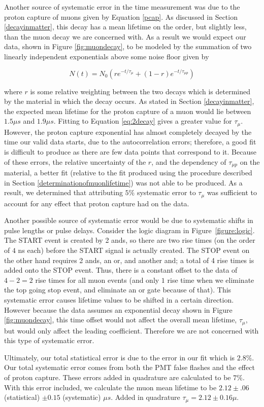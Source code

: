 Another source of systematic error in the time measurement was due to the proton capture of muons given by Equation \eqref{pcap}.  As discussed in Section \ref{decayinmatter}, this decay has a mean lifetime on the order, but slightly less, than the muon decay we are concerned with.  As a result we would expect our data, shown in Figure \ref{fig:muondecay}, to be modeled by the summation of two linearly independent exponentials above some noise floor given by

\begin{center}
\begin{equation}
\label{eq:2decay}
N(t)=N_{0}(r e^{-t/\tau_{\mu}}+(1-r)e^{-t/\tau_{\mu p}})
\end{equation}
\end{center}

where $r$ is some relative weighting between the two decays which is determined by the material in which the decay occurs.  As stated in Section \ref{decayinmatter}, the expected mean lifetime for the proton capture of a muon would lie between $1.5 \mu s$ and $1.9 \mu s$.  Fitting to Equation \eqref{eq:2decay} gives a greater value for $\tau_{\mu}$. However, the proton capture exponential has almost completely decayed by the time our valid data starts, due to the autocorrelation errors; therefore, a good fit is difficult to produce as there are few data points that correspond to it. Because of these errors, the relative uncertainty of the $r$, and the dependency of $\tau_{\mu p}$ on the material, a better fit (relative to the fit produced using the procedure described in Section \ref{determinationofmuonlifetime}) was not able to be produced. As a result, we determined that attributing $5\%$ systematic error to $\tau_{\mu}$ was sufficient to account for any effect that proton capture had on the data. 

Another possible source of systematic error would be due to systematic shifts in pulse lengths or pulse delays. Consider the logic diagram in Figure~\ref{figure:logic}. The START event is created by 2 ands, so there are two rise times (on the order of $4$ ns each) before the START signal is actually created. The STOP event on the other hand requires 2 ands, an or, and another and; a total of 4 rise times is added onto the STOP event. Thus, there is a constant offset to the data of $4-2=2$ rise times for all muon events (and only $1$ rise time when we eliminate the top going stop event, and eliminate an or gate because of that). This systematic error causes lifetime values to be shifted in a certain direction.  However because the data assumes an exponential decay shown in Figure \ref{fig:muondecay}, this time offset would not affect the overall mean lifetime, $\tau_{\mu}$, but would only affect the leading coefficient. Therefore we are not concerned with this type of systematic error.

Ultimately, our total statistical error is due to the error in our fit which is $2.8\%$.  Our total systematic error comes from both the PMT false flashes and the effect of proton capture.  These errors added in quadrature are calculated to be $7\%$.  With this error included, we calculate the muon mean lifetime to be $2.12\pm.06$ (statistical) $\pm0.15$ (systematic) $\mu s$.  Added in quadrature $\tau_{\mu}=2.12\pm0.16\mu$.
